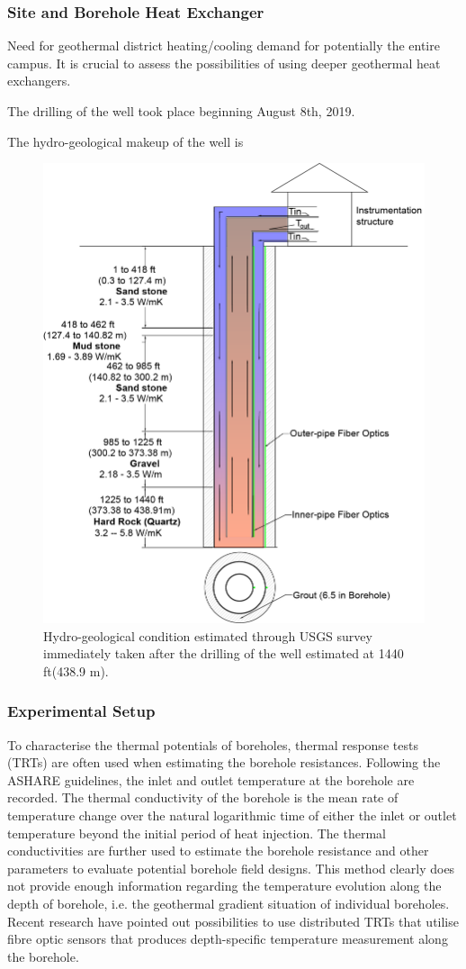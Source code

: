 \subsubsection{Site and Borehole Heat Exchanger}
	Need for geothermal district heating/cooling demand for potentially the entire campus. It is crucial to assess the possibilities of using deeper geothermal heat exchangers. 
	
	The drilling of the well took place beginning August 8th, 2019. 
	
	The hydro-geological makeup of the well is 
	\begin{figure}
	\centering
	\includegraphics[height=0.5\textwidth]{data/geology_cbhe.png}
	\caption{Hydro-geological condition estimated through USGS survey immediately taken after the drilling of the well estimated at 1440 ft(438.9 m).}\label{fg:hydro}	
	\end{figure}


	
\subsubsection{Experimental Setup}
	To characterise the thermal potentials of boreholes, thermal response tests (TRTs) are often used when estimating the borehole resistances. Following the ASHARE guidelines, the inlet and outlet temperature at the borehole are recorded. The thermal conductivity of the borehole is the mean rate of temperature change over the natural logarithmic time of either the inlet or outlet temperature beyond the initial period of heat injection. The thermal conductivities are further used to estimate the borehole resistance and other parameters to evaluate potential borehole field designs. This method clearly does not provide enough information regarding the temperature evolution along the depth of borehole, i.e. the geothermal gradient situation of individual boreholes. Recent research have pointed out possibilities to use distributed TRTs that utilise fibre optic sensors that produces depth-specific temperature measurement along the borehole.  
	
